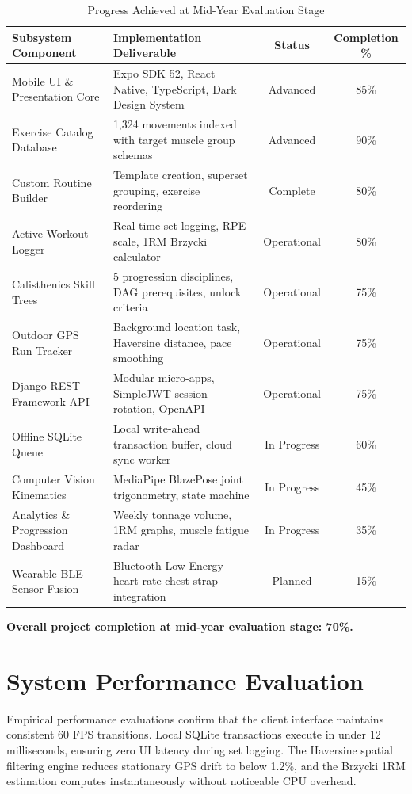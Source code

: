 \documentclass[12pt,a4paper]{report}
\begin{document}
\begin{table}[H]
\centering
\footnotesize
\renewcommand{\arraystretch}{1.15}
\begin{tabularx}{\textwidth}{|p{4.2cm}|X|c|c|}
\hline
\textbf{Subsystem Component} & \textbf{Implementation Deliverable} & \textbf{Status} & \textbf{Completion \%} \\
\hline
Mobile UI \& Presentation Core & Expo SDK 52, React Native, TypeScript, Dark Design System & Advanced & 85\% \\
\hline
Exercise Catalog Database & 1,324 movements indexed with target muscle group schemas & Advanced & 90\% \\
\hline
Custom Routine Builder & Template creation, superset grouping, exercise reordering & Complete & 80\% \\
\hline
Active Workout Logger & Real-time set logging, RPE scale, 1RM Brzycki calculator & Operational & 80\% \\
\hline
Calisthenics Skill Trees & 5 progression disciplines, DAG prerequisites, unlock criteria & Operational & 75\% \\
\hline
Outdoor GPS Run Tracker & Background location task, Haversine distance, pace smoothing & Operational & 75\% \\
\hline
Django REST Framework API & Modular micro-apps, SimpleJWT session rotation, OpenAPI & Operational & 75\% \\
\hline
Offline SQLite Queue & Local write-ahead transaction buffer, cloud sync worker & In Progress & 60\% \\
\hline
Computer Vision Kinematics & MediaPipe BlazePose joint trigonometry, state machine & In Progress & 45\% \\
\hline
Analytics \& Progression Dashboard & Weekly tonnage volume, 1RM graphs, muscle fatigue radar & In Progress & 35\% \\
\hline
Wearable BLE Sensor Fusion & Bluetooth Low Energy heart rate chest-strap integration & Planned & 15\% \\
\hline
\end{tabularx}
\caption{Progress Achieved at Mid-Year Evaluation Stage}
\label{tab:progress_status}
\end{table}

\textbf{Overall project completion at mid-year evaluation stage: 70\%.}

\section{System Performance Evaluation}
Empirical performance evaluations confirm that the client interface maintains consistent 60 FPS transitions. Local SQLite transactions execute in under 12 milliseconds, ensuring zero UI latency during set logging. The Haversine spatial filtering engine reduces stationary GPS drift to below 1.2\%, and the Brzycki 1RM estimation computes instantaneously without noticeable CPU overhead.
\end{document}
